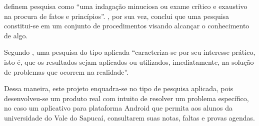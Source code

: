	
	\par {} definem pesquisa como “uma indagação minuciosa
ou exame crítico e exaustivo na procura de fatos e princípios”.
, por sua vez, conclui que uma pesquisa constitui-se
em um conjunto de procedimentos visando alcançar o conhecimento de algo.

	\par Segundo , uma pesquisa do tipo aplicada
“caracteriza-se por seu interesse prático, isto é, que os resultados sejam
aplicados ou utilizados, imediatamente, na solução de problemas que ocorrem na
realidade”.

	\par Dessa maneira, este projeto enquadra-se no tipo de pesquisa aplicada,
pois desenvolveu-se um produto real com intuito de resolver um problema específico,
no caso um aplicativo para plataforma Android que permita aos alunos da universidade
do Vale do Sapucaí, consultarem suas notas, faltas e provas agendas.
